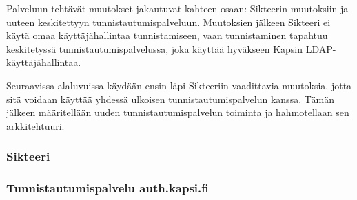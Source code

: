Palveluun tehtävät muutokset jakautuvat kahteen osaan: Sikteerin muutoksiin ja uuteen keskitettyyn tunnistautumispalveluun. Muutoksien jälkeen Sikteeri ei käytä omaa käyttäjähallintaa tunnistamiseen, vaan tunnistaminen tapahtuu keskitetyssä tunnistautumispalvelussa, joka käyttää hyväkseen Kapsin LDAP-käyttäjähallintaa.

Seuraavissa alaluvuissa käydään ensin läpi Sikteeriin vaadittavia muutoksia, jotta sitä voidaan käyttää yhdessä ulkoisen tunnistautumispalvelun kanssa. Tämän jälkeen määritellään uuden tunnistautumispalvelun toiminta ja hahmotellaan sen arkkitehtuuri.

\subsubsection{Sikteeri}

\subsubsection{Tunnistautumispalvelu auth.kapsi.fi}
